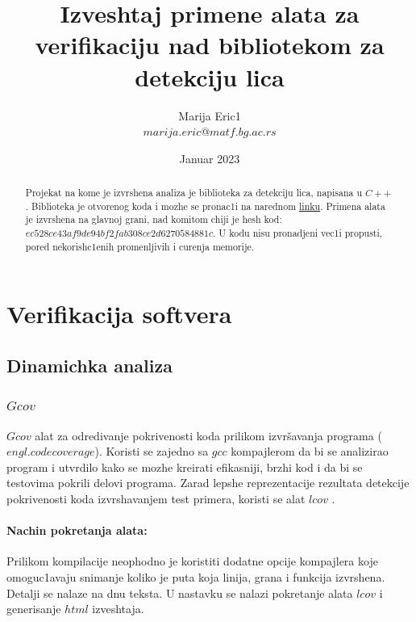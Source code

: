 \documentclass{article}
\title{Izveshtaj primene alata za verifikaciju nad bibliotekom za detekciju lica}
\author{Marija Eric1 \\ 
$marija.eric@matf.bg.ac.rs$}
\date{Januar 2023}
\begin{document}
\maketitle
\renewcommand{\abstractname}{Sazhetak}
\renewcommand*\contentsname{Sadrzhaj}



\begin{abstract}
Projekat na kome je izvrshena analiza je biblioteka za detekciju lica, napisana u $C++$. Biblioteka je otvorenog koda i mozhe se pronac1i na narednom \href{https://github.com/ShiqiYu/libfacedetection}{linku}. 
Primena alata je izvrshena na glavnoj grani, nad komitom chiji je hesh kod: $ec528ce43af9de94bf2fab308ce2d6270584881c$. U kodu nisu pronadjeni vec1i propusti, pored nekorish\-c1enih promenljivih i curenja memorije.
\end{abstract}
\tableofcontents
\newpage

\section{Verifikacija softvera}
\subsection{Dinamichka analiza}
\subsubsection{$Gcov$}
$Gcov$ alat za odredivanje pokrivenosti koda prilikom
izvršavanja programa ($engl. code coverage$). Koristi se zajedno sa $gcc$ kompajlerom
da bi se analizirao program i utvrdilo kako se mozhe kreirati efikasniji, brzhi kod i da bi
se testovima pokrili delovi programa.
Zarad lepshe reprezentacije rezultata detekcije pokrivenosti koda izvrshavanjem test primera,
koristi se alat $lcov$ \cite{VSskripta}.

\paragraph{Nachin pokretanja alata:}
Prilikom kompilacije neophodno je koristiti dodatne opcije kompajlera koje
omoguc1avaju snimanje koliko je puta koja linija, grana i funkcija izvrshena. Detalji se nalaze na dnu teksta. U nastavku se nalazi pokretanje alata $lcov$ i generisanje $html$ izveshtaja.
\selectfont

\inputminted[firstline=5]{shell-session}{run_gcov.sh}
\end{document}
